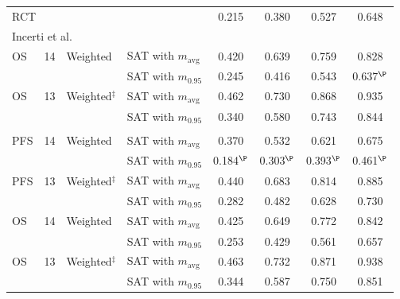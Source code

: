 \begin{table}[!htb]
\begin{tabular}{lclccccccc}
\multicolumn{6}{l}{RCT} & 0.215 & 0.380 & 0.527 & 0.648 \\
\multicolumn{10}{l}{Incerti et al.~\cite{Incerti2023}} \\
OS & 14 & Weighted & \multicolumn{3}{l}{SAT with $m_{\mathrm{avg}}$} & 0.420 & 0.639 & 0.759 & 0.828 \\
 &  &  & \multicolumn{3}{l}{SAT with $m_{0.95}$} & 0.245 & 0.416 & 0.543 & 0.637$^{\P}$ \\
OS & 13 & Weighted$^{\ddagger}$ & \multicolumn{3}{l}{SAT with $m_{\mathrm{avg}}$} & 0.462 & 0.730 & 0.868 & 0.935 \\
 &  &  & \multicolumn{3}{l}{SAT with $m_{0.95}$} & 0.340 & 0.580 & 0.743 & 0.844 \\
\addlinespace
\multicolumn{10}{l}{Bahmane et al.~\cite{Bahmane2025}} \\
PFS & 14 & Weighted & \multicolumn{3}{l}{SAT with $m_{\mathrm{avg}}$} & 0.370 & 0.532 & 0.621 & 0.675 \\
 &  &  & \multicolumn{3}{l}{SAT with $m_{0.95}$} & 0.184$^{\P}$ & 0.303$^{\P}$ & 0.393$^{\P}$ & 0.461$^{\P}$ \\
PFS & 13 & Weighted$^{\ddagger}$ & \multicolumn{3}{l}{SAT with $m_{\mathrm{avg}}$} & 0.440 & 0.683 & 0.814 & 0.885 \\
 &  &  & \multicolumn{3}{l}{SAT with $m_{0.95}$} & 0.282 & 0.482 & 0.628 & 0.730 \\
OS & 14 & Weighted & \multicolumn{3}{l}{SAT with $m_{\mathrm{avg}}$} & 0.425 & 0.649 & 0.772 & 0.842 \\
 &  &  & \multicolumn{3}{l}{SAT with $m_{0.95}$} & 0.253 & 0.429 & 0.561 & 0.657 \\
OS & 13 & Weighted$^{\ddagger}$ & \multicolumn{3}{l}{SAT with $m_{\mathrm{avg}}$} & 0.463 & 0.732 & 0.871 & 0.938 \\
 &  &  & \multicolumn{3}{l}{SAT with $m_{0.95}$} & 0.344 & 0.587 & 0.750 & 0.851 \\
\bottomrule
\end{tabular}
\par\smallskip
\begin{minipage}{0.95\linewidth}
\footnotesize

\end{minipage}
\end{table}
